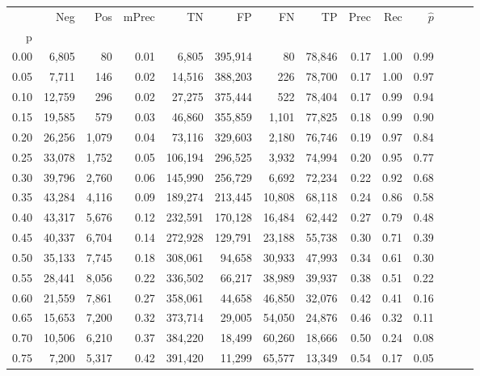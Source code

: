 \begin{tabular}{rrrrrrrrrrrrrr}
\toprule
{} &     Neg &    Pos & mPrec &       TN &       FP &      FN &      TP &  Prec &   Rec & $\hat{p}$ \\
p    &         &        &       &          &          &         &         &       &       &           \\
\midrule
0.00 &   6,805 &     80 &  0.01 &    6,805 &  395,914 &      80 &  78,846 &  0.17 &  1.00 &      0.99 \\
0.05 &   7,711 &    146 &  0.02 &   14,516 &  388,203 &     226 &  78,700 &  0.17 &  1.00 &      0.97 \\
0.10 &  12,759 &    296 &  0.02 &   27,275 &  375,444 &     522 &  78,404 &  0.17 &  0.99 &      0.94 \\
0.15 &  19,585 &    579 &  0.03 &   46,860 &  355,859 &   1,101 &  77,825 &  0.18 &  0.99 &      0.90 \\
0.20 &  26,256 &  1,079 &  0.04 &   73,116 &  329,603 &   2,180 &  76,746 &  0.19 &  0.97 &      0.84 \\
0.25 &  33,078 &  1,752 &  0.05 &  106,194 &  296,525 &   3,932 &  74,994 &  0.20 &  0.95 &      0.77 \\
0.30 &  39,796 &  2,760 &  0.06 &  145,990 &  256,729 &   6,692 &  72,234 &  0.22 &  0.92 &      0.68 \\
0.35 &  43,284 &  4,116 &  0.09 &  189,274 &  213,445 &  10,808 &  68,118 &  0.24 &  0.86 &      0.58 \\
0.40 &  43,317 &  5,676 &  0.12 &  232,591 &  170,128 &  16,484 &  62,442 &  0.27 &  0.79 &      0.48 \\
0.45 &  40,337 &  6,704 &  0.14 &  272,928 &  129,791 &  23,188 &  55,738 &  0.30 &  0.71 &      0.39 \\
0.50 &  35,133 &  7,745 &  0.18 &  308,061 &   94,658 &  30,933 &  47,993 &  0.34 &  0.61 &      0.30 \\
0.55 &  28,441 &  8,056 &  0.22 &  336,502 &   66,217 &  38,989 &  39,937 &  0.38 &  0.51 &      0.22 \\
0.60 &  21,559 &  7,861 &  0.27 &  358,061 &   44,658 &  46,850 &  32,076 &  0.42 &  0.41 &      0.16 \\
0.65 &  15,653 &  7,200 &  0.32 &  373,714 &   29,005 &  54,050 &  24,876 &  0.46 &  0.32 &      0.11 \\
0.70 &  10,506 &  6,210 &  0.37 &  384,220 &   18,499 &  60,260 &  18,666 &  0.50 &  0.24 &      0.08 \\
0.75 &   7,200 &  5,317 &  0.42 &  391,420 &   11,299 &  65,577 &  13,349 &  0.54 &  0.17 &      0.05 \\

\end{tabular}

